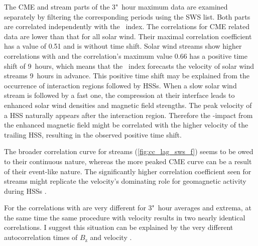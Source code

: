 \pagebreak

The CME and stream parts of the 3"~hour maximum data are examined separately by filtering the corresponding periods using the SWS list. Both parts are correlated independently with the \Kp~index. The correlations for CME related data are lower than that for all solar wind. Their maximal correlation coefficient has a value of 0.51 and is without time shift.
Solar wind streams show higher correlations with \Kp{} and the correlation's maximum value 0.66 has a positive time shift of 9~hours, which means that the \Kp~index forecasts the velocity of solar wind streams 9~hours in advance.
This positive time shift may be explained from the occurrence of interaction regions followed by HSSs. When a slow solar wind stream is followed by a fast one, the compression at their interface leads to enhanced solar wind densities and magnetic field strengths. The peak velocity of a HSS naturally appears after the interaction region. Therefore the \Kp-impact from the enhanced magnetic field might be correlated with the higher velocity of the trailing HSS, resulting in the observed positive time shift.

The broader correlation curve for streams (\autoref{fig:cc_lag_sws_f}) seems to be owed to their continuous nature, whereas the more peaked CME curve can be a result of their event-like nature. The significantly higher correlation coefficient seen for streams might replicate the velocity's dominating role for geomagnetic activity during HSSs \citep{Holappa2014}.

For \vBz{} the correlations with \Kp{} are very different for 3"~hour averages and extrema, at the same time the same procedure with velocity results in two nearly identical correlations. I suggest this situation can be explained by the very different autocorrelation times of $B_\text{z}$ and velocity \citep{Elliott2013}.


